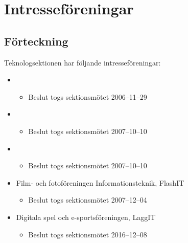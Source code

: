 \section{Intresseföreningar}

\subsection{Förteckning}

Teknologsektionen har följande intresseföreningar:

\begin{itemize}
	\item \EIGHTBITFULL{}
	\begin{itemize}
		\item Beslut togs sektionsmötet 2006--11--29
	\end{itemize}
	\item \DRAWITFULL{}
	\begin{itemize}
		\item Beslut togs sektionsmötet 2007--10--10
	\end{itemize}
	\item \HOOKITFULL{}
	\begin{itemize}
		\item Beslut togs sektionsmötet 2007--10--10
	\end{itemize}
	\item Film- och fotoföreningen Informationsteknik, FlashIT
	\begin{itemize}
		\item Beslut togs sektionsmötet 2007--12--04
	\end{itemize}
	\item Digitala spel och e-sportsföreningen, LaggIT
	\begin{itemize}
		\item Beslut togs sektionsmötet 2016--12--08
	\end{itemize}
\end{itemize}